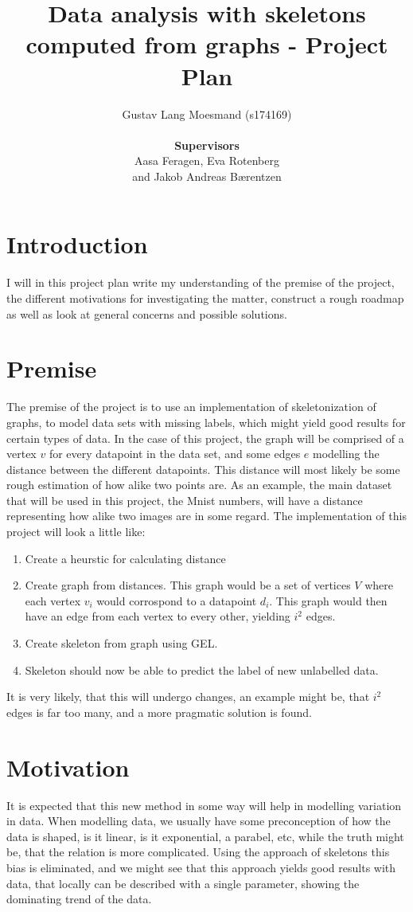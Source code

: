 \documentclass{article}
\title{Data analysis with skeletons computed from graphs - Project Plan}
\author{Gustav Lang Moesmand (s174169)\\\\\textbf{Supervisors}\\Aasa Feragen, Eva Rotenberg\\ and Jakob Andreas Bærentzen}
\begin{document}
\maketitle

\section{Introduction}
I will in this project plan write my understanding of the premise of the project, the different motivations for investigating the matter, construct a rough roadmap as well as look at general concerns and possible solutions.

\section{Premise}
The premise of the project is to use an implementation of skeletonization of graphs, to model data sets with missing labels, which might yield good results for certain types of data. In the case of this project, the graph will be comprised of a vertex $v$ for every datapoint in the data set, and some edges $e$ modelling the distance between the different datapoints. This distance will most likely be some rough estimation of how alike two points are. As an example, the main dataset that will be used in this project, the Mnist numbers, will have a distance representing how alike two images are in some regard. The implementation of this project will look a little like:

\begin{enumerate}
    \item Create a heurstic for calculating distance 
    \item Create graph from distances. This graph would be a set of vertices $V$ where each vertex $v_i$ would corrospond to a datapoint $d_i$. This graph would then have an edge from each vertex to every other, yielding $i^2$ edges. 
    \item Create skeleton from graph using GEL.
    \item Skeleton should now be able to predict the label of new unlabelled data.
\end{enumerate}
It is very likely, that this will undergo changes, an example might be, that $i^2$ edges is far too many, and a more pragmatic solution is found.

\section{Motivation}
It is expected that this new method in some way will help in modelling variation in data. When modelling data, we usually have some preconception of how the data is shaped, is it linear, is it exponential, a parabel, etc, while the truth might be, that the relation is more complicated. Using the approach of skeletons this bias is eliminated, and we might see that this approach yields good results with data, that locally can be described with a single parameter, showing the dominating trend of the data.
\newpage
\end{document}
